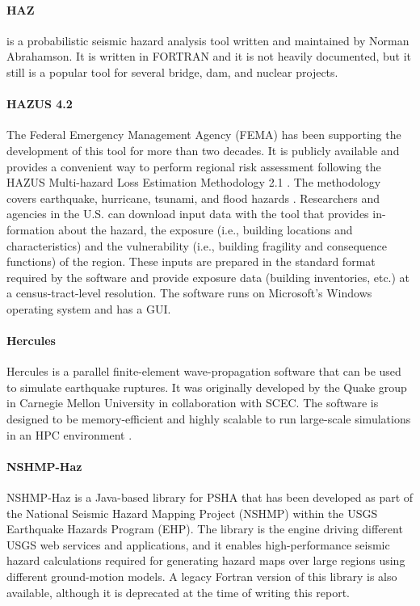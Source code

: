 \paragraph{HAZ}  is a probabilistic seismic hazard analysis tool written and maintained by Norman Abrahamson. It is written in FORTRAN and it is not heavily documented, but it still is a popular tool for several bridge, dam, and nuclear projects.

\paragraph{HAZUS 4.2} The Federal Emergency Management Agency (FEMA) has been supporting the development of this tool for more than two decades. It is publicly available and provides a convenient way to perform regional risk assessment following the HAZUS Multi-hazard Loss Estimation Methodology 2.1 \citep{fema2011hurricanetechnical,fema2011earthquaketechnical,fema2011floodtechnical,fema2017tsunamitechnical}. The methodology covers earthquake, hurricane, tsunami, and flood hazards %
. Researchers and agencies in the U.S. can download input data with the tool that provides in-formation about the hazard, the exposure (i.e., building locations and characteristics) and the vulnerability (i.e., building fragility and consequence functions) of the region. These inputs are prepared in the standard format required by the software and provide exposure data (building inventories, etc.) at a census-tract-level resolution. The software runs on Microsoft's Windows operating system and has a GUI.

\paragraph{Hercules} Hercules \citep{tu2006mesh} is a parallel finite-element wave-propagation software that can be used to simulate earthquake ruptures. It was originally developed by the Quake group in Carnegie Mellon University in collaboration with SCEC. The software is designed to be memory-efficient and highly scalable to run large-scale simulations in an HPC environment \citep{taborda2010speeding}. 

\paragraph{NSHMP-Haz} NSHMP-Haz is a Java-based library for PSHA that has been developed as part of the National Seismic Hazard Mapping Project (NSHMP) within the USGS Earthquake Hazards Program (EHP). The library is the engine driving different USGS web services and applications, and it enables high-performance seismic hazard calculations required for generating hazard maps over large regions using different ground-motion models. A legacy Fortran version of this library is also available, although it is deprecated at the time of writing this report.

